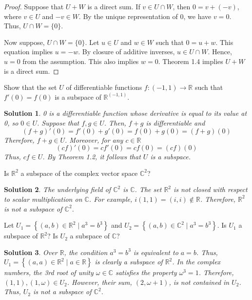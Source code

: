 \documentclass{book}
\newcommand{\real}{\mathbb{R}}
\newcommand{\complex}{\mathbb{C}}
\newcommand{\set}[2]{\left\{#1\;\vert\;#2\right\}}
\newtheorem*{soln}{Solution}
\theoremstyle{definition}
\begin{document}
\begin{proof}
    Suppose that $U+W$ is a direct sum. If $v\in U\cap W$, then $0 = v+(-v)$,
    where $v\in U$ and $-v\in W$. By the unique representation of 0, we have
    $v=0$. Thus, $U \cap W =\{0\}$.

    Now suppose, $U \cap W = \{0\}$. Let $u\in U$ and $w\in W$ such that
    $0=u+w$. This equation implies $u=-w$. By closure of additive inverses,
    $u\in U\cap W$. Hence, $u=0$ from the assumption. This also implies $w=0$.
    Theorem 1.4 implies $U+W$ is a direct sum.
\end{proof}
\break

\begin{problem}
    Show that the set $U$ of differentiable functions $f:(-1,1)\to\real$ such 
    that $f'(0) = f(0)$ is a subspace of $\real^{(-1,1)}$.
\end{problem}

\begin{soln}
    0 is a differentiable function whose derivative is equal to its value at 0,
    so $0\in U$. Suppose that $f,g \in U$. Then, $f+g$ is differentiable and
    \[
        (f+g)'(0) = f'(0)+g'(0) = f(0)+g(0) = (f+g)(0)
    \]
    Therefore, $f+g\in U$. Moreover, for any $c\in\real$
    \[
        (cf)'(0) = cf'(0) = cf(0) = (cf)(0)
    \]
    Thus, $cf\in U$. By Theorem 1.2, it follows that $U$ is a subspace.
\end{soln}

\begin{problem}
    Is $\real^2$ a subspace of the complex vector space $\complex^2$?
\end{problem}

\begin{soln}
    The underlying field of $\complex^2$ is $\complex$. The set $\real^2$ is not
    closed with respect to scalar multiplication on $\complex$. For example,
    $i(1,1) = (i,i)\notin\real$. Therefore, $\real^2$ is not a subspace of
    $\complex^2$.
\end{soln}

\begin{problem}
    Let $U_1 = \set{(a,b)\in\real^2}{a^3=b^3}$ and $U_2 =
    \set{(a,b)\in\complex^2}{a^3=b^3}$. Is $U_1$ a subspace of $\real^2$? Is
    $U_2$ a subspace of $\complex$?
\end{problem}

\begin{soln}
    Over $\real$, the condition $a^3=b^3$ is equivalent to $a=b$. Thus, $U_1 =
    \set{(a,a)\in\real^2}{a\in\real}$ is clearly a subspace of $\real^2$.
    In the complex numbers, the 3rd root of unity $\omega\in\complex$ satisfies 
    the property $\omega^3 = 1$. Therefore, $(1,1),(1,\omega)\in U_2$. However,
    their sum, $(2,\omega+1)$, is not contained in $U_2$. Thus, $U_2$ is not a
    subspace of $\complex^2$.
\end{soln}
\end{document}
